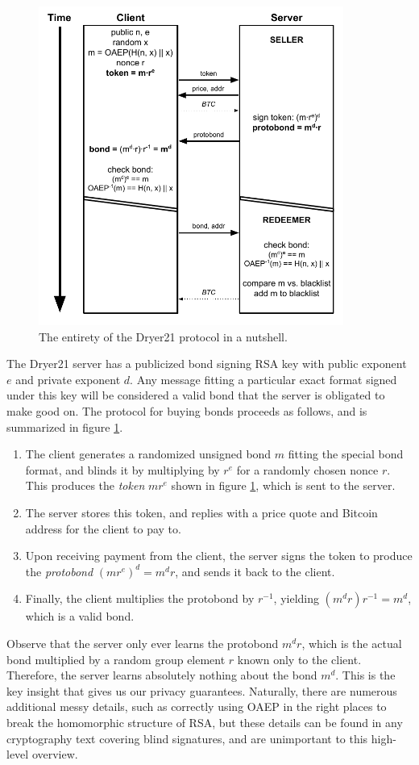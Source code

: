 \documentclass[12pt]{article}
\begin{document}
\begin{figure}[ht]
\begin{center}
\includegraphics[width=10cm]{dryer21-crypto.pdf}
\end{center}
\caption{The entirety of the Dryer21 protocol in a nutshell.\label{over}}
\end{figure}

The Dryer21 server has a publicized bond signing RSA key with public exponent $e$ and private exponent $d$.
Any message fitting a particular exact format signed under this key will be considered a valid bond that the server is obligated to make good on.
The protocol for buying bonds proceeds as follows, and is summarized in figure \ref{over}.
\begin{enumerate}
\item The client generates a randomized unsigned bond $m$ fitting the special bond format, and blinds it by multiplying by $r^e$ for a randomly chosen nonce $r$.
This produces the \emph{token} $m r^e$ shown in figure \ref{over}, which is sent to the server.
\item The server stores this token, and replies with a price quote and Bitcoin address for the client to pay to.
\item Upon receiving payment from the client, the server signs the token to produce the \emph{protobond} $(m r^e)^d = m^d r$, and sends it back to the client.
\item Finally, the client multiplies the protobond by $r^{-1}$, yielding $(m^d r) r^{-1} = m^d$, which is a valid bond.
\end{enumerate}
Observe that the server only ever learns the protobond $m^d r$, which is the actual bond multiplied by a random group element $r$ known only to the client.
Therefore, the server learns absolutely nothing about the bond $m^d$.
This is the key insight that gives us our privacy guarantees.
Naturally, there are numerous additional messy details, such as correctly using OAEP in the right places to break the homomorphic structure of RSA, but these details can be found in any cryptography text covering blind signatures, and are unimportant to this high-level overview.
\end{document}
